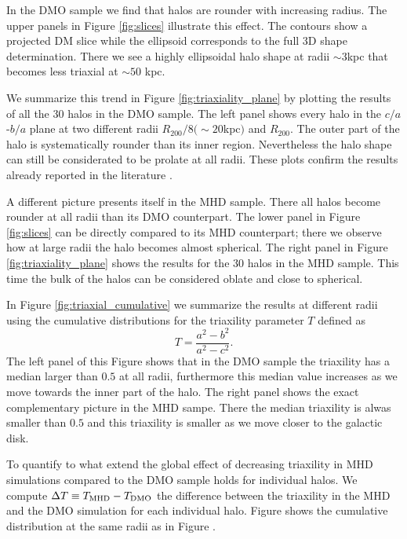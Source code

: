 \documentclass[a4paper,fleqn,usenatbib]{mnras}
\begin{document}
In the DMO sample we find that halos are rounder with increasing
radius.
The upper panels in Figure \ref{fig:slices} illustrate this effect.
The contours show a projected DM slice while the ellipsoid corresponds
to the full 3D shape determination. 
There we see a highly ellipsoidal halo shape at radii $\sim 3$kpc
that becomes less triaxial at $\sim 50$ kpc.

We summarize this trend in Figure \ref{fig:triaxiality_plane} by
plotting the results of all the 30 halos in the DMO sample.
The left panel shows every halo in the $c/a$-$b/a$ plane at
two different radii $R_{200}/8 (\sim 20$kpc$)$ and $R_{200}$. 
The outer part of the halo is systematically rounder than its inner
region. 
Nevertheless the halo shape can still be considerated to be prolate at
all radii. 
These plots confirm the results already reported in the
literature \citep{VeraCiro11}.

A different picture presents itself in the MHD sample.
There all halos become rounder at all radii than its DMO
counterpart.
The lower panel in Figure \ref{fig:slices} can be directly compared to
its MHD counterpart; there we observe how at large radii the halo
becomes almost spherical. 
The right panel in Figure \ref{fig:triaxiality_plane} shows the
results for the 30 halos in the MHD sample.
This time the bulk of the halos can be considered oblate and close to
spherical. 

In Figure \ref{fig:triaxial_cumulative} we summarize the results at
different radii using the cumulative distributions for the 
triaxility parameter $T$ defined as 
\begin{equation}
T=\frac{a^2-b^2}{a^2-c^2}.
\label{eq:triaxiality}
\end{equation}
The left panel of this Figure shows that in the DMO sample the
triaxility has a median larger than $0.5$ at all radii, furthermore
this median value increases as we move towards the inner part of the
halo.
The right panel shows the exact complementary picture in the MHD
sampe.
There the median triaxility is alwas smaller than $0.5$ and this
triaxility is smaller as we move closer to the galactic disk.


To quantify to what extend the global effect of decreasing
triaxility in MHD simulations compared to the DMO sample 
holds for individual halos. 
We compute $\Delta T\equiv T_{\rm MHD}-T_{\rm DMO}$ the difference between the
triaxility in the MHD and the DMO simulation for each individual halo. 
Figure \label{fig:delta_triaxial_cumulative} shows the cumulative
distribution at the same radii as in
Figure \label{fig:delta_triaxial_cumulative}. 
    
\end{document}
